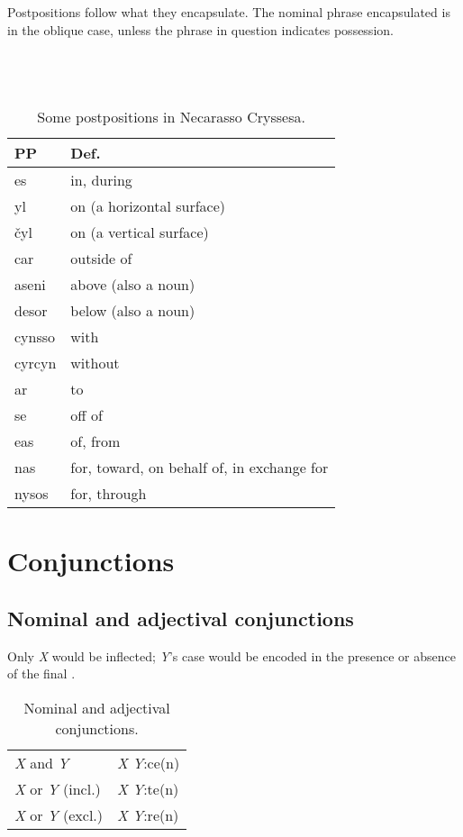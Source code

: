 \documentclass{book}
\begin{document}
Postpositions follow what they encapsulate. The nominal phrase encapsulated is in the oblique case, unless the phrase in question indicates possession. \\
~\\
   \\
   \\
  

\begin{table}[h]
  \caption{Some postpositions in Necarasso Cryssesa.}
  \centering
  \begin{tabu} to \linewidth {|l|X|}
    \hline
    PP & Def. \\
    \hline
    es & in, during \\
    yl & on (a horizontal surface) \\
    čyl & on (a vertical surface) \\
    car & outside of \\
    aseni & above (also a noun) \\
    desor & below (also a noun) \\
    cynsso & with \\
    cyrcyn & without \\
    ar & to \\
    se & off of \\
    eas & of, from \\
    nas & for, toward, on behalf of, in exchange for \\
    nysos & for, through \\
    \hline
  \end{tabu}
\end{table}

\chapter{Conjunctions}

\section{Nominal and adjectival conjunctions}

Only \emph{X} would be inflected; \emph{Y}'s case would be encoded in the presence or absence of the final .

\begin{table}[ht]
  \caption{Nominal and adjectival conjunctions.}
  \centering
	\begin{tabular}{|l|l|}
	  \hline
	  \emph{X} and \emph{Y} & \emph{X} \emph{Y}:ce(n) \\
	  \emph{X} or \emph{Y} (incl.) & \emph{X} \emph{Y}:te(n) \\
	  \emph{X} or \emph{Y} (excl.) & \emph{X} \emph{Y}:re(n) \\ \hline
	\end{tabular}
\end{table}
\end{document}
